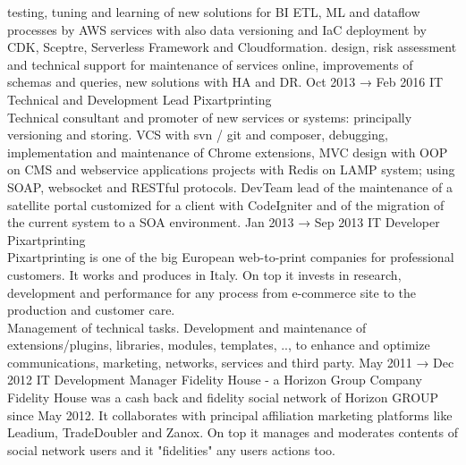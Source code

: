 \documentclass[8pt]{stackoverflow-upgraded-version} %
\begin{document}
\begin{entrylist}
{		 testing, tuning and learning of new solutions for BI ETL, ML and dataflow processes by AWS services with also data versioning and IaC deployment by CDK, Sceptre, Serverless Framework and Cloudformation.
		 design, risk assessment and technical support for maintenance of services online, improvements of schemas and queries, new solutions with HA and DR.}
	\entry
		{Oct 2013 → Feb 2016}
		{IT Technical and Development Lead}
		{Pixartprinting}
		{\\
		 Technical consultant and promoter of new services or systems: principally versioning and storing.
		 VCS with svn / git and composer, debugging, implementation and maintenance of Chrome extensions, MVC design with OOP
		on CMS and webservice applications projects with Redis on LAMP system; using SOAP, websocket and RESTful protocols.
		 DevTeam lead of the maintenance of a satellite portal customized for a client with CodeIgniter and of the migration of
		the current system to a SOA environment.}
	\entry
		{Jan 2013 → Sep 2013}
		{IT Developer}
		{Pixartprinting}
		{\\
		 Pixartprinting is one of the big European web-to-print companies for professional customers. It works
		and produces in Italy. On top it invests in research, development and performance for any process from e-commerce site to
		the production and customer care.\vspace{1mm}\\
		 Management of technical tasks. Development and maintenance of extensions/plugins, libraries, modules,
		templates, .., to enhance and optimize communications, marketing, networks, services and third party.}
	\entry
		{May 2011 → Dec 2012}
		{IT Development Manager}
		{Fidelity House - a Horizon Group Company}
		{\\
		 Fidelity House was a cash back and fidelity social network of Horizon GROUP since May 2012. It
		collaborates with principal affiliation marketing platforms like Leadium, TradeDoubler and Zanox. On top it manages and
		moderates contents of social network users and it "fidelities" any users actions too.\vspace{1mm}\\
}
\end{entrylist}
\end{document}

